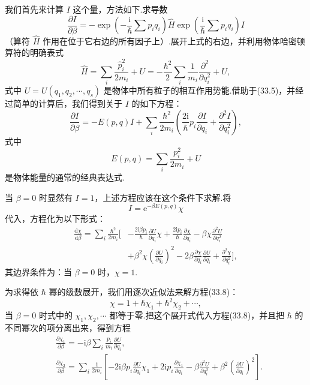 我们首先来计算 $I$ 这个量，方法如下.求导数
\begin{equation*}
  \frac{\partial I}{\partial\beta}
  =-\exp\left(-\frac{\mathrm{i}}{\hbar}\sum p_iq_i\right)\hat{H}
  \exp\left(\frac{\mathrm{i}}{\hbar}\sum p_iq_i\right)I
\end{equation*}
（算符 $\hat{H}$ 作用在位于它右边的所有因子上）.展开上式的右边，并利用物体哈密顿算符的明确表式
\begin{equation}
  \hat{H}=\sum_i\frac{\hat{p}_i^2}{2m_i}+U
  =-\frac{\hbar^2}{2}\sum_i\frac{1}{m_i}\frac{\partial^2}{\partial q_i^2}+U,
\end{equation}
式中 $U=U(q_1,q_2,\cdots,q_s)$ 是物体中所有粒子的相互作用势能.借助于(33.5)，并经过简单的计算后，我们得到关于 $I$ 的如下方程：
\begin{equation}
  \frac{\partial I}{\partial\beta}=-E(p,q)I
  +\sum_i\frac{\hbar^2}{2m_i}\left(\frac{2\mathrm{i}}{\hbar}p_i\frac{\partial I}{\partial q_i}
  +\frac{\partial^2I}{\partial q_i^2}\right),
\end{equation}
式中
\begin{equation*}
  E(p,q)=\sum_i\frac{p_i^2}{2m_i}+U
\end{equation*}
是物体能量的通常的经典表达式.

当 $\beta=0$ 时显然有 $I=1$，上述方程应该在这个条件下求解.将
\begin{equation}
  I=\mathrm{e}^{-\beta E(p,q)}\chi
\end{equation}
代入，方程化为以下形式：
\begin{equation}
\begin{aligned}
  \frac{\mathrm{d}\chi}{\mathrm{d}\beta}=\sum_i\frac{\hbar^2}{2m_i}\bigg[
  &-\frac{2\mathrm{i}\beta p_i}{\hbar}\frac{\partial U}{\partial q_i}\chi
  +\frac{2\mathrm{i}p_i}{\hbar}\frac{\partial\chi}{\partial q_i}
  -\beta\chi\frac{\partial^2U}{\partial q_i^2}\\
  &+\beta^2\chi\left(\frac{\partial U}{\partial q_i}\right)^2
  -2\beta\frac{\partial\chi}{\partial q_i}\frac{\partial U}{\partial q_i}
  +\frac{\partial^2\chi}{\partial q_i^2}\bigg],
\end{aligned}
\end{equation}
其边界条件为：当 $\beta=0$ 时，$\chi=1$.

为求得依 $\hbar$ 幂的级数展开，我们用逐次近似法来解方程(33.8)：
\begin{equation}
  \chi=1+\hbar\chi_1+\hbar^2\chi_2+\cdots,
\end{equation}
当 $\beta=0$ 时式中的 $\chi_1,\chi_2,\cdots$ 都等于零.把这个展开式代入方程(33.8)，并且把 $\hbar$ 的不同幂次的项分离出来，得到方程
\begin{equation*}
\begin{aligned}
  &\frac{\partial\chi_1}{\partial\beta}
  =-\mathrm{i}\beta\sum_i\frac{p_i}{m_i}\frac{\partial U}{\partial q_i},\\
  &\frac{\partial\chi_2}{\partial\beta}
  =\sum_i\frac{1}{2m_i}\left[
  -2\mathrm{i}\beta p_i\frac{\partial U}{\partial q_i}\chi_1
  +2\mathrm{i}p_i\frac{\partial\chi_1}{\partial q_i}
  -\beta\frac{\partial^2U}{\partial q_i^2}
  +\beta^2\left(\frac{\partial U}{\partial q_i}\right)^2\right].
\end{aligned}
\end{equation*}

